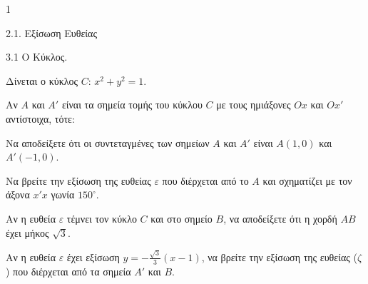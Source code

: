 \begin{ylh}{1}
    \item 2.1. Εξίσωση Ευθείας
    \item 3.1 Ο Κύκλος.
\end{ylh}
Δίνεται ο κύκλος $C$: $x^2+y^2=1$.
\begin{alist}
\item Αν $A$ και $A'$ είναι τα σημεία τομής του κύκλου $C$ με τους ημιάξονες $Ox$ και $Ox'$ αντίστοιχα, τότε:
    \begin{rlist}
    \item Να αποδείξετε ότι οι συντεταγμένες των σημείων $A$ και $A'$ είναι $A(1,0)$ και $A'(-1,0)$. 
    \item Να βρείτε την εξίσωση της ευθείας $\varepsilon$ που διέρχεται από το $A$ και σχηματίζει με τον άξονα $x'x$ γωνία $150^\circ$. 
    \end{rlist}
\item Αν η ευθεία $\varepsilon$ τέμνει τον κύκλο $C$ και στο σημείο $B$, να αποδείξετε ότι η χορδή $AB$ έχει μήκος $\sqrt{3}$. 
\item Αν η ευθεία $\varepsilon$ έχει εξίσωση $y = - \frac{\sqrt{3}}{3} (x-1)$, να βρείτε την εξίσωση της ευθείας ($\zeta$) που διέρχεται από τα σημεία $A'$ και $B$. 
\end{alist}